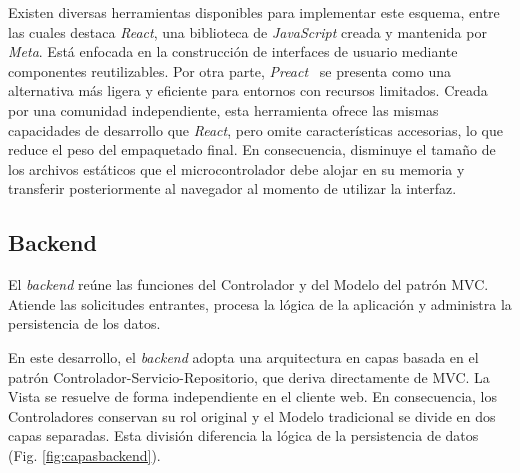 Existen diversas herramientas disponibles para implementar este esquema, entre las cuales destaca \emph{React}, una biblioteca de \emph{JavaScript} creada y mantenida por \emph{Meta}. Está enfocada en la construcción de interfaces de usuario mediante componentes reutilizables. Por otra parte, \emph{Preact}~\cite{preact} se presenta como una alternativa más ligera y eficiente para entornos con recursos limitados. Creada por una comunidad independiente, esta herramienta ofrece las mismas capacidades de desarrollo que \emph{React}, pero omite características accesorias, lo que reduce el peso del empaquetado final. En consecuencia, disminuye el tamaño de los archivos estáticos que el microcontrolador debe alojar en su memoria y transferir posteriormente al navegador al momento de utilizar la interfaz.



\subsection{Backend}

El \emph{backend} reúne las funciones del Controlador y del Modelo del patrón MVC. Atiende las solicitudes entrantes, procesa la lógica de la aplicación y administra la persistencia de los datos.

En este desarrollo, el \emph{backend} adopta una arquitectura en capas basada en el patrón Controlador-Servicio-Repositorio, que deriva directamente de MVC. La Vista se resuelve de forma independiente en el cliente web. En consecuencia, los Controladores conservan su rol original y el Modelo tradicional se divide en dos capas separadas. Esta división diferencia la lógica de la persistencia de datos (Fig. \ref{fig:capasbackend}).

